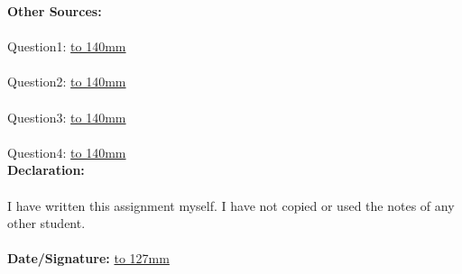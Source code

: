 \documentclass[11pt]{article}
\theoremstyle{definition}
\begin{document}
\textbf{Other Sources:}
\\\\
Question1: \underline{\hbox to 140mm{}}
\\\\
Question2: \underline{\hbox to 140mm{}}
\\\\
Question3: \underline{\hbox to 140mm{}}
\\\\
Question4: \underline{\hbox to 140mm{}}
\\

\textbf{Declaration:}
\\\\
{\small I have written this assignment myself. I have not copied or used the notes of any other student.}
\\\\
\textbf{Date/Signature:} \underline{\hbox to 127mm{}}
\end{document}
